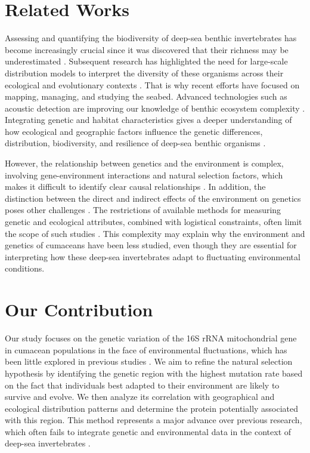 \section{Related Works}\label{related-works}
Assessing and quantifying the biodiversity of deep-sea benthic invertebrates has become increasingly crucial since it was discovered that their richness may be underestimated \citep{grassle1992deep}. Subsequent research has highlighted the need for large-scale distribution models to interpret the diversity of these organisms across their ecological and evolutionary contexts \citep{rex1997large}. That is why recent efforts have focused on mapping, managing, and studying the seabed. Advanced technologies such as acoustic detection are improving our knowledge of benthic ecosystem complexity \citep{brown2011benthic}. Integrating genetic and habitat characteristics gives a deeper understanding of how ecological and geographic factors influence the genetic differences, distribution, biodiversity, and resilience of deep-sea benthic organisms \citep{vrijenhoek2009cryptic}.

However, the relationship between genetics and the environment is complex, involving gene-environment interactions and natural selection factors, which makes it difficult to identify clear causal relationships \citep{balkenhol_identifying_2009}. In addition, the distinction between the direct and indirect effects of the environment on genetics poses other challenges \citep{manel_perspectives_2010, balkenhol_landscape_2019}. The restrictions of available methods for measuring genetic and ecological attributes, combined with logistical constraints, often limit the scope of such studies \citep{manel_perspectives_2010, shafer_widespread_2013}. This complexity may explain why the environment and genetics of cumaceans have been less studied, even though they are essential for interpreting how these deep-sea invertebrates adapt to fluctuating environmental conditions.

\section{Our Contribution}\label{contribution}
Our study focuses on the genetic variation of the 16S rRNA mitochondrial gene in cumacean populations in the face of environmental fluctuations, which has been little explored in previous studies \citep{grassle1992deep, rex2000latitudinal}. We aim to refine the natural selection hypothesis by identifying the genetic region with the highest mutation rate based on the fact that individuals best adapted to their environment are likely to survive and evolve. We then analyze its correlation with geographical and ecological distribution patterns and determine the protein potentially associated with this region. This method represents a major advance over previous research, which often fails to integrate genetic and environmental data in the context of deep-sea invertebrates \citep{etter1990population, vrijenhoek2009cryptic}.

